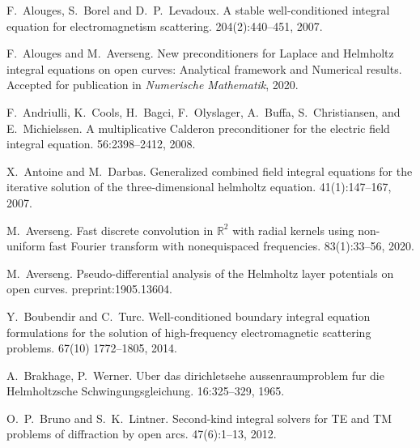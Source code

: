 \documentclass[]{report}
\begin{document}
\begin{small}
  \begin{thebibliography}{0}
		
		F.~Alouges, S.~Borel and D.~P.~Levadoux.
		\newblock A stable well-conditioned integral equation for electromagnetism scattering.
		 204(2):440--451, 2007.
		
		
		F.~Alouges and M.~Averseng.
		\newblock New preconditioners for Laplace and Helmholtz integral equations on open curves: Analytical framework and Numerical results. 
		\newblock Accepted for publication in {\em Numerische Mathematik}, 2020.


		F.~Andriulli, K.~Cools, H.~Bagci, F.~Olyslager, A.~Buffa, S.~Christiansen,
		and E.~Michielssen.
		\newblock A multiplicative {C}alderon preconditioner for the
		electric field integral equation.
		 56:2398--2412, 2008.
                
		X.~Antoine and M.~Darbas.
		\newblock Generalized combined field integral equations for the iterative
		solution of the three-dimensional helmholtz equation.
		41(1):147--167, 2007.
		
		M.~Averseng.
		\newblock Fast discrete convolution in $\mathbb {R}^{2} $ with radial kernels using non-uniform fast Fourier transform with nonequispaced frequencies. 
		 83(1):33--56, 2020.
		
		M.~Averseng. 
		\newblock Pseudo-differential analysis of the Helmholtz layer potentials on open curves. 
		 preprint:1905.13604.
		
		Y.~Boubendir and C.~Turc.
		\newblock Well-conditioned boundary integral equation formulations for the solution of high-frequency electromagnetic scattering problems.
		 67(10) 1772--1805, 2014.
		
		A.~Brakhage, P.~Werner.
		\newblock Uber das dirichletsehe aussenraumproblem fur die Helmholtzsche Schwingungsgleichung.
		 16:325–329, 1965.
		
		O.~P.~Bruno and S.~K.~Lintner.
		\newblock Second-kind integral solvers for TE and TM problems of diffraction by open arcs.
		 47(6):1--13, 2012.
		

\end{thebibliography}
\end{small}
\end{document}
